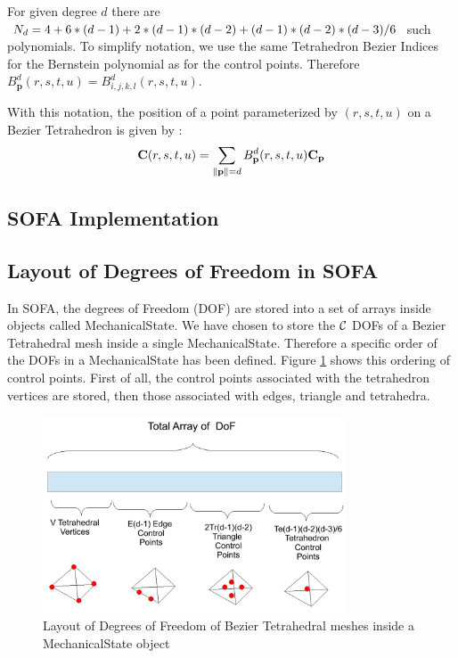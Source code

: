 \documentclass[a4paper,11pt]{article}
\begin{document}
For given degree $d$ there are $N_d=4+6*({d}-1)+2*({d}-1)*({d}-2)+({d}-1)*({d}-2)*({d}-3)/6$ such polynomials. To simplify notation, we use the same Tetrahedron Bezier Indices for the Bernstein polynomial as for the control points. Therefore $B^d_{\mathbf p}(r,s,t,u)=B^d_{i,j,k,l}(r,s,t,u)$.

With this notation, the position of a point parameterized by $(r,s,t,u)$ on a Bezier Tetrahedron is given by :
\[
{\mathbf C}(r,s,t,u)=\sum_{\|\mathbf p\|={d}}  B^d_{\mathbf p}(r,s,t,u) {\mathbf C}_{\mathbf p}
\]

\subsection{SOFA Implementation}

\subsection{Layout of Degrees of Freedom in SOFA}

In SOFA, the degrees of Freedom (DOF) are stored into a set of arrays inside objects called MechanicalState.
We have chosen to store the ${\mathcal C}$ DOFs of a Bezier Tetrahedral mesh inside a single MechanicalState. Therefore a specific order of the DOFs in a MechanicalState has been defined. 
Figure \ref{fig:LayoutBezierTetrahedron} shows this ordering of control points. First of all, the control points associated with the tetrahedron vertices are stored, then those associated with edges, triangle and tetrahedra.

\begin{figure}[!htbp]
	\centering
    \includegraphics[width=0.80\textwidth]{DofLayoutBezierTetrahedron}
	\caption{Layout of Degrees of Freedom of Bezier Tetrahedral meshes inside a MechanicalState object}
	\label{fig:LayoutBezierTetrahedron}
\end{figure}
\end{document}
